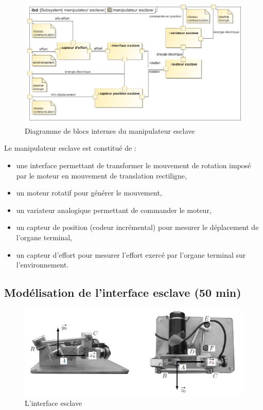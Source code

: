 \begin{figure}[ht!]
\begin{center}
 \includegraphics[width=0.9\linewidth]{img/Figure9}
\end{center}
\caption{Diagramme de blocs internes du manipulateur esclave}
\label{fig9}
\end{figure}

Le manipulateur esclave est constitué de :
\begin{itemize}
 \item une interface permettant de transformer le mouvement de rotation imposé par le moteur
en mouvement de translation rectiligne,
 \item un moteur rotatif pour générer le mouvement,
 \item un variateur analogique permettant de commander le moteur,
 \item un capteur de position (codeur incrémental) pour mesurer le déplacement de l'organe terminal,
 \item un capteur d'effort pour mesurer l'effort exercé par l'organe terminal sur  l'environnement.
\end{itemize}

\subsection{Modélisation de l'interface esclave (50 min)}

\begin{figure}[ht!]
\begin{center}
 \includegraphics[width=0.9\linewidth]{img/Figure10}
\end{center}
\caption{L'interface esclave}
\label{fig10}
\end{figure}

